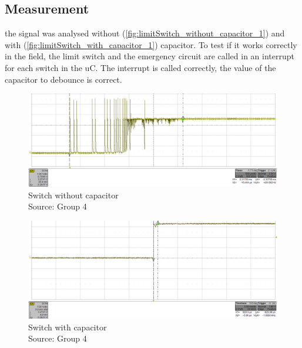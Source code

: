 \documentclass[a4paper,12pt]{scrreprt}
\begin{document}
\subsection{Measurement}

 the signal was analysed without (\autoref{fig:limitSwitch_without_capacitor_1}) and with (\autoref{fig:limitSwitch_with_capacitor_1}) capacitor. To test if it works correctly in the field, the limit switch and the emergency circuit are called in an interrupt for each switch in the \acs{uC}. The interrupt is called correctly, the value of the capacitor to debounce is correct.

\begin{figure}[H]
  \centering
   \includegraphics[width=1\textwidth]{pictures/measurements/limitSwitch_without_capacitor_1}
   \caption[Switch without capacitor]{Switch without capacitor\\
	Source: Group 4  
  }
   \label{fig:limitSwitch_without_capacitor_1}
\end{figure}

\begin{figure}[H]
  \centering
   \includegraphics[width=1\textwidth]{pictures/measurements/limitSwitch_with_capacitor_1}
   \caption[Switch with capacitor]{Switch with capacitor\\
	Source: Group 4  
  }
   \label{fig:limitSwitch_with_capacitor_1}
\end{figure}
\end{document}
